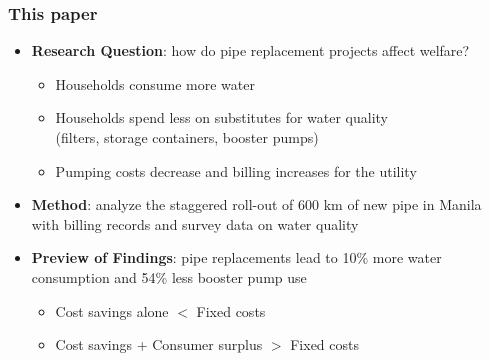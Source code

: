 \documentclass[aspectratio=32]{beamer}
\begin{document}
\begin{frame}
\frametitle{This paper}
\centering



\begin{itemize}
  \item \textbf{Research Question}: how do pipe replacement projects affect welfare?
    \begin{itemize}
      \item Households consume more water 
      \item Households spend less on substitutes for water quality \\
      (filters, storage containers, booster pumps)
      \item Pumping costs decrease and billing increases for the utility
    \end{itemize}
  \vspace{2mm}
  \item \textbf{Method}: analyze the staggered roll-out of 600 km of new pipe in Manila with billing records and survey data on water quality
  \vspace{2mm}
  \item \textbf{Preview of Findings}: pipe replacements lead to 10\% more water consumption and 54\% less booster pump use
    \begin{itemize}
      \item Cost savings alone $<$ Fixed costs
      \item Cost savings + Consumer surplus $>$ Fixed costs
    \end{itemize}

\end{itemize}

\end{frame}
\end{document}
